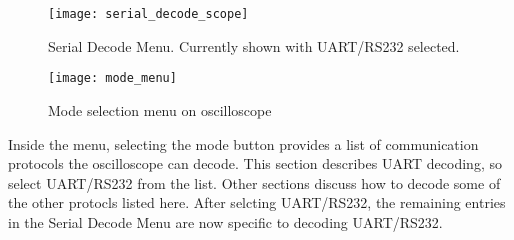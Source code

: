 \documentclass{article}
\begin{document}
  \begin{wrapfigure}{r}{44ex}
    \texttt{[image: serial\_decode\_scope]}
    \caption{Serial Decode Menu. Currently shown with UART/RS232 selected.}
  \end{wrapfigure}

  \begin{wrapfigure}{r}{25ex}
    \texttt{[image: mode\_menu]}
    \caption{Mode selection menu on oscilloscope}
  \end{wrapfigure}

  Inside the menu, selecting the mode button provides a list of communication
  protocols the oscilloscope can decode. This section describes UART decoding,
  so select UART/RS232 from the list. Other sections discuss how to decode some
  of the other protocls listed here. After selcting UART/RS232, the remaining
  entries in the Serial Decode Menu are now specific to decoding UART/RS232.
\end{document}
